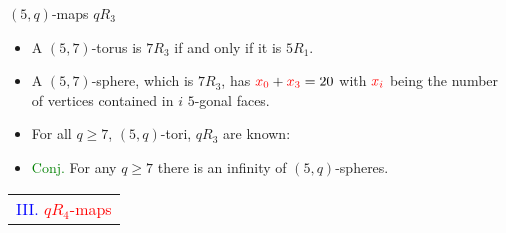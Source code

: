 \documentclass[%
pdf,
colorBG,
slideColor,
]{prosper}
\begin{document}
\begin{slide}{$(5,q)$-maps $qR_3$}
\begin{itemize}
\item A $(5,7)$-torus is $7R_3$ if and only if it is $5R_1$.
\item A $(5,7)$-sphere, which is $7R_3$, has $\textcolor{red}{x_0}+\textcolor{red}{x_3}=20$ with $\textcolor{red}{x_i}$ being the number of vertices contained in $i$ $5$-gonal faces.
\item For all $q\geq 7$, $(5,q)$-tori, $qR_3$ are known:
\begin{center}
\begin{minipage}{3.5cm}
\centering
{}\par
\end{minipage}
\begin{minipage}{3.5cm}
\centering
{}\par
\end{minipage}
\begin{minipage}{3.5cm}
\centering
{}\par
\end{minipage}
\end{center}
\item \textcolor{green}{Conj.} For any $q\geq 7$ there is an infinity of $(5,q)$-spheres.
\end{itemize}

\end{slide}





\begin{slide}{}
\begin{center}
{\Huge 
\begin{tabular*}{7cm}{c}
\\[-0.5cm]
\textcolor{blue}{III. }\textcolor{red}{$qR_4$-maps}
\end{tabular*}
}
\end{center}
\end{slide}
\end{document}
